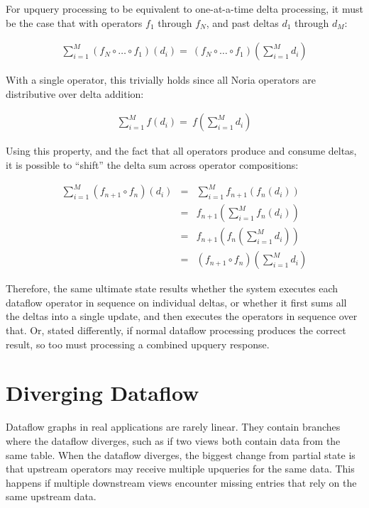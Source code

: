 For upquery processing to be equivalent to one-at-a-time delta processing, it
must be the case that with operators $f_1$ through $f_N$, and past deltas $d_1$
through $d_M$:

\begin{eqnarray*}
  \sum^M_{i=1}\left(f_N \circ \dots \circ f_1\right)\left(d_i\right) = \
  \left(f_N \circ \dots \circ f_1\right)\left(\sum^M_{i=1}d_i\right)
\end{eqnarray*}

With a single operator, this trivially holds since all Noria operators are
distributive over delta addition:

\begin{eqnarray*}
  \sum^M_{i=1}f\left(d_i\right) = \
  f\left(\sum^M_{i=1}d_i\right)
\end{eqnarray*}

Using this property, and the fact that all operators produce and consume deltas,
it is possible to ``shift'' the delta sum across operator compositions:

\begin{eqnarray*}
  \sum^M_{i=1}\left(f_{n+1} \circ f_n\right)\left(d_i\right) &=& \sum^M_{i=1}f_{n+1}\left(f_n\left(d_i\right)\right) \\
  &=& f_{n+1}\left(\sum^M_{i=1}f_n\left(d_i\right)\right) \\
  &=& f_{n+1}\left(f_n\left(\sum^M_{i=1}d_i\right)\right) \\
  &=& \left(f_{n+1} \circ f_n\right)\left(\sum^M_{i=1}d_i\right)
\end{eqnarray*}

Therefore, the same ultimate state results whether the system executes each
dataflow operator in sequence on individual deltas, or whether it first sums
all the deltas into a single update, and then executes the operators in sequence
over that. Or, stated differently, if normal dataflow processing produces the
correct result, so too must processing a combined upquery response.

\section{Diverging Dataflow}

Dataflow graphs in real applications are rarely linear. They contain branches
where the dataflow diverges, such as if two views both contain data from the
same table. When the dataflow diverges, the biggest change from partial state is
that upstream operators may receive multiple upqueries for the same data. This
happens if multiple downstream views encounter missing entries that rely on the
same upstream data.

